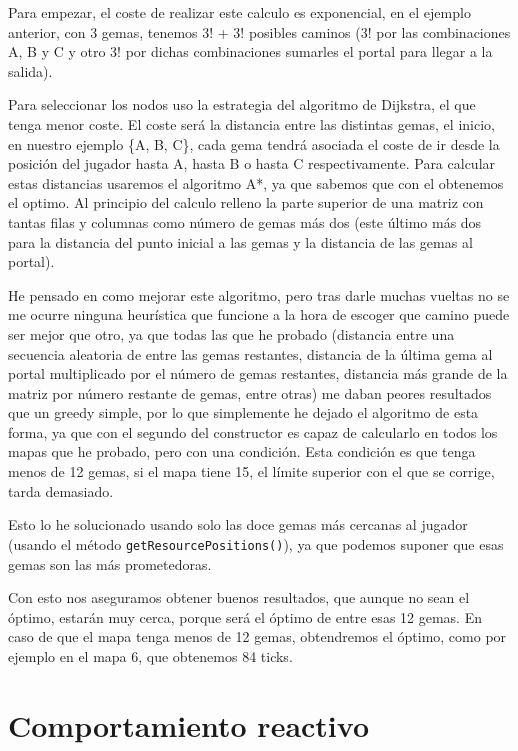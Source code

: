 \documentclass[10pt, spanish]{article}
\begin{document}
Para empezar, el coste de realizar este calculo es exponencial, en el ejemplo anterior, con 3 gemas, tenemos 3! + 3! posibles caminos (3! por las combinaciones A, B y C y otro 3! por dichas combinaciones sumarles el portal para llegar a la salida).

Para seleccionar los nodos uso la estrategia del algoritmo de Dijkstra, el que tenga menor coste. El coste será la distancia entre las distintas gemas, el inicio, en nuestro ejemplo \{A, B, C\}, cada gema tendrá asociada el coste de ir desde la posición del jugador hasta A, hasta B o hasta C respectivamente. Para calcular estas distancias usaremos el algoritmo A*, ya que sabemos que con el obtenemos el optimo. Al principio del calculo relleno la parte superior de una matriz con tantas filas y columnas como número de gemas más dos (este último más dos para la distancia del punto inicial a las gemas y la distancia de las gemas al portal).

He pensado en como mejorar este algoritmo, pero tras darle muchas vueltas no se me ocurre ninguna heurística que funcione a la hora de escoger que camino puede ser mejor que otro, ya que todas las que he probado (distancia entre una secuencia aleatoria de entre las gemas restantes, distancia de la última gema al portal multiplicado por el número de gemas restantes, distancia más grande de la matriz por número restante de gemas, entre otras) me daban peores resultados que un greedy simple, por lo que simplemente he dejado el algoritmo de esta forma, ya que con el segundo del constructor es capaz de calcularlo en todos los mapas que he probado, pero con una condición. Esta condición es que tenga menos de 12 gemas, si el mapa tiene 15, el límite superior con el que se corrige, tarda demasiado.

Esto lo he solucionado usando solo las doce gemas más cercanas al jugador (usando el método \texttt{getResourcePositions()}), ya que podemos suponer que esas gemas son las más prometedoras.

Con esto nos aseguramos obtener buenos resultados, que aunque no sean el óptimo, estarán muy cerca, porque será el óptimo de entre esas 12 gemas. En caso de que el mapa tenga menos de 12 gemas, obtendremos el óptimo, como por ejemplo en el mapa 6, que obtenemos 84 ticks.

\section{Comportamiento reactivo}
\end{document}
